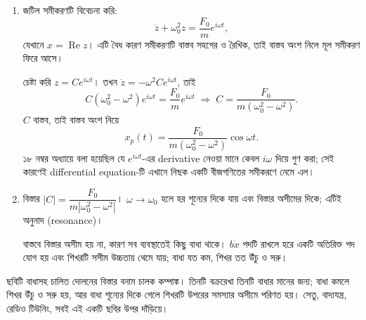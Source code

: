 \documentclass[11pt]{article}
\begin{document}
\begin{sol}
\begin{enumerate}
  \item জটিল সমীকরণটি বিবেচনা করি:
        \[
          \ddot{z} + \omega_{0}^{2}z = \frac{F_{0}}{m}e^{i\omega t} ,
        \]
        যেখানে $x = \operatorname{Re}z$। এটি বৈধ কারণ সমীকরণটি বাস্তব সহগের
        ও রৈখিক, তাই বাস্তব অংশ নিলে মূল সমীকরণ ফিরে আসে।

        চেষ্টা করি $z = Ce^{i\omega t}$। তখন
        $\ddot{z} = -\omega^{2}Ce^{i\omega t}$, তাই
        \[
          C\left( \omega_{0}^{2} - \omega^{2} \right)e^{i\omega t}
          = \frac{F_{0}}{m}e^{i\omega t}
          \;\Longrightarrow\;
          C = \frac{F_{0}}{m\left( \omega_{0}^{2}-\omega^{2} \right)} .
        \]
        $C$ বাস্তব, তাই বাস্তব অংশ নিয়ে
        \[
          x_{p}(t) = \frac{F_{0}}{m\left( \omega_{0}^{2}-\omega^{2} \right)}
          \cos\omega t .
        \]
        ১৮ নম্বর অধ্যায়ে বলা হয়েছিল যে $e^{i\omega t}$-এর derivative
        নেওয়া মানে কেবল $i\omega$ দিয়ে গুণ করা; সেই কারণেই differential
        equation-টি এখানে নিছক একটি বীজগণিতের সমীকরণে নেমে এল।
  \item বিস্তার $\left| C \right| = \dfrac{F_{0}}
        {m\left| \omega_{0}^{2}-\omega^{2} \right|}$। $\omega \to \omega_{0}$
        হলে হর শূন্যের দিকে যায় এবং বিস্তার অসীমের দিকে; এটিই অনুনাদ
        (resonance)।

        বাস্তবে বিস্তার অসীম হয় না, কারণ সব ব্যবস্থাতেই কিছু বাধা থাকে।
        $b\dot{x}$ পদটি রাখলে হরে একটি অতিরিক্ত পদ যোগ হয় এবং শিখরটি সসীম
        উচ্চতায় থেমে যায়; বাধা যত কম, শিখর তত উঁচু ও সরু।
\end{enumerate}
\end{sol}

\begin{center}
\end{center}

ছবিটি বাধাসহ চালিত দোলনের বিস্তার বনাম চালক কম্পাঙ্ক। তিনটি বক্ররেখা তিনটি
বাধার মানের জন্য; বাধা কমলে শিখর উঁচু ও সরু হয়, আর বাধা শূন্যের দিকে গেলে
শিখরটি উপরের সমস্যার অসীমে পরিণত হয়। সেতু, বাদ্যযন্ত্র, রেডিও টিউনিং, সবই
এই একটি ছবির উপর দাঁড়িয়ে।
\end{document}
